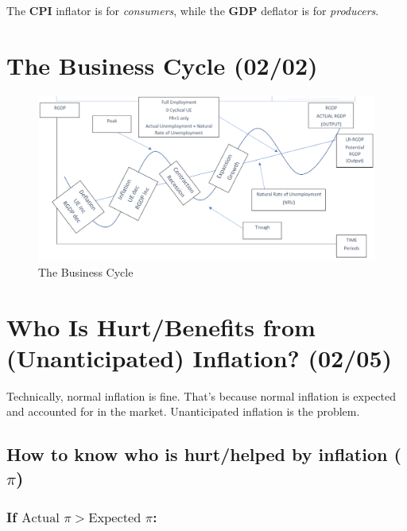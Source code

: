 \documentclass[
  letterpaper,
  DIV=11,
  numbers=noendperiod]{scrartcl}
\begin{document}
The \textbf{CPI} inflator is for \emph{consumers}, while the
\textbf{GDP} deflator is for \emph{producers}.

\section{The Business Cycle (02/02)}\label{the-business-cycle-0202}

\begin{figure}[H]

{\centering \includegraphics[width=1\textwidth,height=\textheight]{img/business-cycle.png}

}

\caption{The Business Cycle}

\end{figure}%

\section{Who Is Hurt/Benefits from (Unanticipated) Inflation?
(02/05)}\label{who-is-hurtbenefits-from-unanticipated-inflation-0205}

Technically, normal inflation is fine. That's because normal inflation
is expected and accounted for in the market. Unanticipated inflation is
the problem.

\subsection{\texorpdfstring{How to know who is hurt/helped by inflation
(\(\pi\))}{How to know who is hurt/helped by inflation (\textbackslash pi)}}\label{how-to-know-who-is-hurthelped-by-inflation-pi}

\subsubsection{\texorpdfstring{If
\(\text{Actual } π > \text{Expected } \pi\):}{If \textbackslash text\{Actual \} π \textgreater{} \textbackslash text\{Expected \} \textbackslash pi:}}\label{if-textactual-ux3c0-textexpected-pi}
\end{document}
